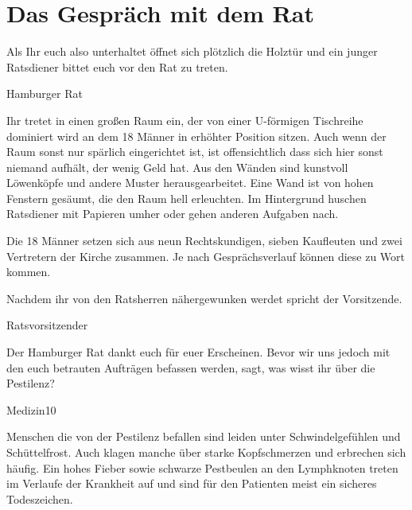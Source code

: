 \section{Das Gespräch mit dem Rat}
\label{sec:ratsgespräch}

Als Ihr euch also unterhaltet öffnet sich plötzlich die Holztür und ein junger
Ratsdiener bittet euch vor den Rat zu treten.

\begin{place-box}{Hamburger Rat}

Ihr tretet in einen großen Raum ein, der von einer U-förmigen Tischreihe dominiert
wird an dem 18 Männer in erhöhter Position sitzen. Auch wenn der Raum sonst nur
spärlich eingerichtet ist, ist offensichtlich dass sich hier sonst niemand aufhält,
der wenig Geld hat. Aus den Wänden sind kunstvoll Löwenköpfe und andere Muster
herausgearbeitet. Eine Wand ist von hohen Fenstern gesäumt, die den Raum hell
erleuchten. Im Hintergrund huschen Ratsdiener mit Papieren umher oder gehen anderen
Aufgaben nach.

\end{place-box}

\begin{info-box}

Die 18 Männer setzen sich aus neun Rechtskundigen, sieben Kaufleuten und zwei
Vertretern der Kirche zusammen. Je nach Gesprächsverlauf können diese zu Wort kommen.

\end{info-box}

Nachdem ihr von den Ratsherren nähergewunken werdet spricht der Vorsitzende.

\begin{say-box}{Ratsvorsitzender}

Der Hamburger Rat dankt euch für euer Erscheinen. Bevor wir uns jedoch mit den euch
betrauten Aufträgen befassen werden, sagt, was wisst ihr über die Pestilenz?

\end{say-box}

\begin{probe-box}{Medizin}{10}

Menschen die von der Pestilenz befallen sind leiden unter Schwindelgefühlen und
Schüttelfrost. Auch klagen manche über starke Kopfschmerzen und erbrechen sich
häufig. Ein hohes Fieber sowie schwarze Pestbeulen an den Lymphknoten treten im
Verlaufe der Krankheit auf und sind für den Patienten meist ein sicheres
Todeszeichen.

\end{probe-box}

